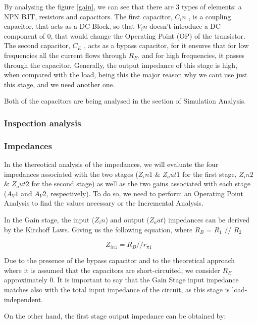 By analysing the figure \ref{gain}, we can see that there are 3 types of elements: a NPN BJT, resistors and capacitors.
The first capacitor, $C_in$ , is a coupling capacitor, that acts as a DC Block, so that $V_in$ doesn’t
introduce a DC component of 0, that would change the Operating Point (OP) of the transistor.
The second capacitor, $C _E$ , acts as a bypass capacitor, for it ensures that for low frequencies
all the current flows through $R_E$, and for high frequencies, it passes through the capacitor.
Generally, the output impedance of this stage is high, when compared with the load,
being this the major reason why we cant use just this stage, and we need another one. \par
Both of the capacitors are being analysed in the section of Simulation Analysis.




\subsubsection{Inspection analysis}


\subsubsection{Impedances}

In the thereotical analysis of the impedances, we will evaluate the four impedances associated with the two
stages ($Z_in1$ \& $Z_out1$ for the first stage, $Z_in2$ \& $Z_out2$ for the second stage) as well as the two gains associated with each stage ($A_V1$ and $A_V2$, respectively). To do so, we need to perform an Operating Point Analysis to find the values necessary or the Incremental Analysis. \par
In the Gain stage, the input ($Z_in$) and output ($Z_out$) impedances can be derived by the Kirchoff Laws.
Giving us the following equation, where $R_B$ = $R_1$ // $R_2$

\begin{equation}
    Z_{in1}=R_B // r_{\pi 1}
\end{equation}

Due to the presence of the bypass capacitor and to the theoretical approach where it is assumed that the capacitors are short-circuited, we consider $R_E$ approximately 0. It is important to say that the Gain Stage input impedance matches also with the total input impedance of the circuit, as this stage is load-independent. \par
On the other hand, the first stage output impedance can be obtained by:

